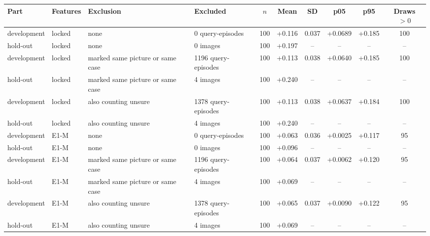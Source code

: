 \begin{tabular}{@{}llp{4.2cm}lcccccc@{}}
\toprule
Part & Features & Exclusion & Excluded & $n$ & Mean & SD & p05 & p95 & Draws $>0$ \\
\midrule
development & locked & none & 0 query-episodes & 100 & +0.116 & 0.037 & +0.0689 & +0.185 & 100 \\
hold-out & locked & none & 0 images & 100 & +0.197 & -- & -- & -- & -- \\
development & locked & marked same picture or same case & 1196 query-episodes & 100 & +0.113 & 0.038 & +0.0640 & +0.185 & 100 \\
hold-out & locked & marked same picture or same case & 4 images & 100 & +0.240 & -- & -- & -- & -- \\
development & locked & also counting unsure & 1378 query-episodes & 100 & +0.113 & 0.038 & +0.0637 & +0.184 & 100 \\
hold-out & locked & also counting unsure & 4 images & 100 & +0.240 & -- & -- & -- & -- \\
development & E1-M & none & 0 query-episodes & 100 & +0.063 & 0.036 & +0.0025 & +0.117 & 95 \\
hold-out & E1-M & none & 0 images & 100 & +0.096 & -- & -- & -- & -- \\
development & E1-M & marked same picture or same case & 1196 query-episodes & 100 & +0.064 & 0.037 & +0.0062 & +0.120 & 95 \\
hold-out & E1-M & marked same picture or same case & 4 images & 100 & +0.069 & -- & -- & -- & -- \\
development & E1-M & also counting unsure & 1378 query-episodes & 100 & +0.065 & 0.037 & +0.0090 & +0.122 & 95 \\
hold-out & E1-M & also counting unsure & 4 images & 100 & +0.069 & -- & -- & -- & -- \\
\bottomrule
\end{tabular}
